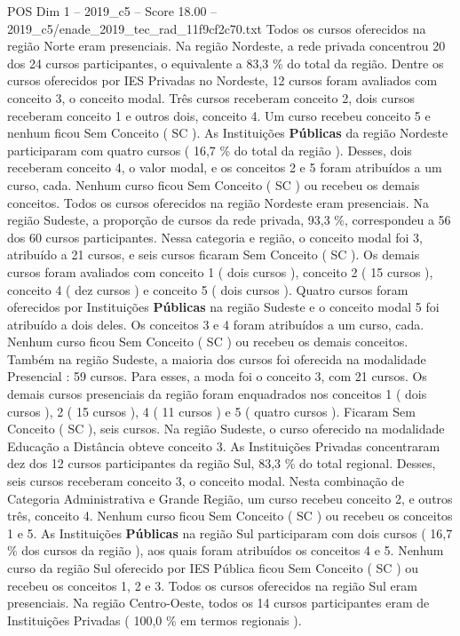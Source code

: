 \begin{textsample}{POS Dim 1 – 2019\_c5 – Score 18.00 – 2019\_c5/enade\_2019\_tec\_rad\_11f9cf2c70.txt}
Todos os cursos oferecidos na região Norte eram presenciais.
Na região Nordeste, a rede privada concentrou 20 dos 24 cursos participantes, o equivalente a 83,3 \% do total da região.
Dentre os cursos oferecidos por IES Privadas no Nordeste, 12 cursos foram avaliados com conceito 3, o conceito modal.
Três cursos receberam conceito 2, dois cursos receberam conceito 1 e outros dois, conceito 4.
Um curso recebeu conceito 5 e nenhum ficou Sem Conceito ( SC ).
As Instituições \textbf{Públicas} da região Nordeste participaram com quatro cursos ( 16,7 \% do total da região ).
Desses, dois receberam conceito 4, o valor modal, e os conceitos 2 e 5 foram atribuídos a um curso, cada.
Nenhum curso ficou Sem Conceito ( SC ) ou recebeu os demais conceitos.
Todos os cursos oferecidos na região Nordeste eram presenciais.
Na região Sudeste, a proporção de cursos da rede privada, 93,3 \%, correspondeu a 56 dos 60 cursos participantes.
Nessa categoria e região, o conceito modal foi 3, atribuído a 21 cursos, e seis cursos ficaram Sem Conceito ( SC ).
Os demais cursos foram avaliados com conceito 1 ( dois cursos ), conceito 2 ( 15 cursos ), conceito 4 ( dez cursos ) e conceito 5 ( dois cursos ).
Quatro cursos foram oferecidos por Instituições \textbf{Públicas} na região Sudeste e o conceito modal 5 foi atribuído a dois deles.
Os conceitos 3 e 4 foram atribuídos a um curso, cada.
Nenhum curso ficou Sem Conceito ( SC ) ou recebeu os demais conceitos.
Também na região Sudeste, a maioria dos cursos foi oferecida na modalidade Presencial : 59 cursos.
Para esses, a moda foi o conceito 3, com 21 cursos.
Os demais cursos presenciais da região foram enquadrados nos conceitos 1 ( dois cursos ), 2 ( 15 cursos ), 4 ( 11 cursos ) e 5 ( quatro cursos ).
Ficaram Sem Conceito ( SC ), seis cursos.
Na região Sudeste, o curso oferecido na modalidade Educação a Distância obteve conceito 3.
As Instituições Privadas concentraram dez dos 12 cursos participantes da região Sul, 83,3 \% do total regional.
Desses, seis cursos receberam conceito 3, o conceito modal.
Nesta combinação de Categoria Administrativa e Grande Região, um curso recebeu conceito 2, e outros três, conceito 4.
Nenhum curso ficou Sem Conceito ( SC ) ou recebeu os conceitos 1 e 5.
As Instituições \textbf{Públicas} na região Sul participaram com dois cursos ( 16,7 \% dos cursos da região ), aos quais foram atribuídos os conceitos 4 e 5.
Nenhum curso da região Sul oferecido por IES Pública ficou Sem Conceito ( SC ) ou recebeu os conceitos 1, 2 e 3.
Todos os cursos oferecidos na região Sul eram presenciais.
Na região Centro-Oeste, todos os 14 cursos participantes eram de Instituições Privadas ( 100,0 \% em termos regionais ).

\end{textsample}
